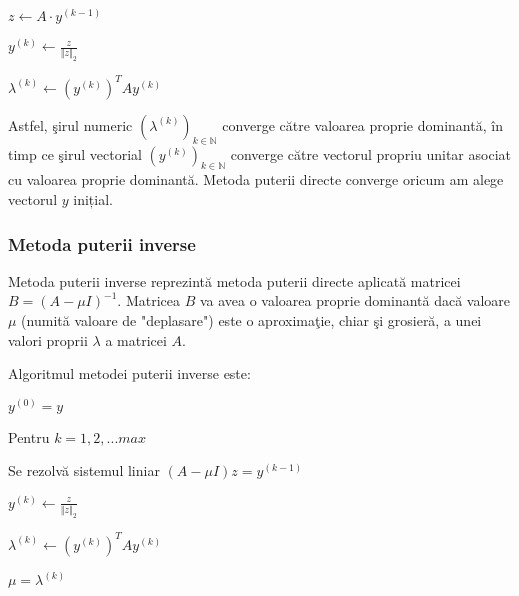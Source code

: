 \documentclass{exam}
\begin{document}
\hspace{0 mm} \hspace{5 mm} $z \leftarrow A \cdot y^{(k-1)}	$

\hspace{0 mm} \hspace{5 mm} $y^{(k)} \leftarrow \frac{z}{\Vert z\Vert_{2}} $

\hspace{0 mm} \hspace{5 mm} $\lambda^{\left( k \right)} \leftarrow (y^{(k)})^{T}Ay^{(k)}$

Astfel, şirul numeric $ \left(\lambda^{\left( k \right)}\right)_{k \in \mathbb{N}}$ converge către valoarea proprie dominantă, în timp ce şirul vectorial $ \left(y^{\left( k \right)}\right)_{k \in \mathbb{N}}$ converge către vectorul propriu unitar asociat cu valoarea proprie dominantă. Metoda puterii directe converge oricum am alege vectorul $y$ inițial.

\subsubsection{Metoda puterii inverse}

Metoda puterii inverse reprezintă metoda puterii directe aplicată matricei $B = (A - \mu I)^{- 1}$. Matricea $B$ va avea o valoarea proprie dominantă dacă valoare $\mu$ (numită valoare de "deplasare") este o aproximaţie, chiar şi grosieră, a unei valori proprii $\lambda$ a matricei $A$.

Algoritmul metodei puterii inverse este:

\hspace{0 mm} $ y^{(0)} = y $

\hspace{0 mm} Pentru $k = 1, 2, ... max$

\hspace{0 mm} \hspace{5 mm} Se rezolvă sistemul liniar $(A - \mu I) z = y^{(k-1)}$

\hspace{0 mm} \hspace{5 mm} $y^{(k)} \leftarrow \frac{z}{\Vert z \Vert_{2}}$

\hspace{0 mm} \hspace{5 mm} $\lambda^{\left( k \right)} \leftarrow (y^{(k)})^{T}Ay^{(k)}$

\hspace{0 mm} \hspace{5 mm} $\mu = \lambda ^{(k)}$
\end{document}
